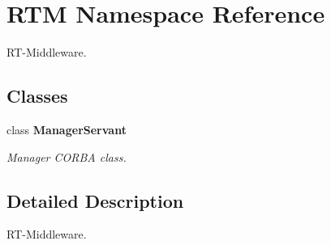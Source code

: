 \section{RTM Namespace Reference}
\label{namespaceRTM}


RT-\/Middleware.  


\subsection*{Classes}
\begin{DoxyCompactItemize}
\item 
class {\bf ManagerServant}
\begin{DoxyCompactList}\small\item\em Manager CORBA class. \item\end{DoxyCompactList}\end{DoxyCompactItemize}


\subsection{Detailed Description}
RT-\/Middleware. 